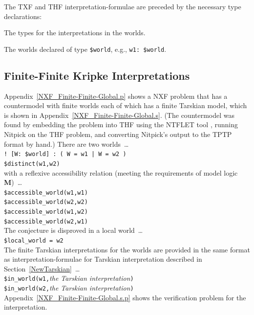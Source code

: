 \documentclass{easychair}
\newcommand{\smalltt}[1]{\small \texttt{#1}}
\newenvironment{packed_itemize}{
\vspace*{-0.3em}
\begin{itemize}
\setlength{\partopsep}{0pt}
\setlength{\itemsep}{1pt}
\setlength{\parskip}{0pt}
\setlength{\parsep}{0pt}
}{\end{itemize}}
\begin{document}
\vspace*{0.5em}
The TXF and THF interpretation-formulae are preceded by the necessary type declarations:
\begin{packed_itemize}
\item The types for the interpretations in the worlds.
\item The worlds declared of type {\tt \$world}, e.g., {\tt w1: \$world}.
\end{packed_itemize}

\subsection{Finite-Finite Kripke Interpretations}
\label{NewKripkeFiniteFinite}

Appendix~\ref{NXF_Finite-Finite-Global.p} shows a NXF problem that has a countermodel with
finite worlds each of which has a finite Tarskian model, which is shown in
Appendix~\ref{NXF_Finite-Finite-Global.s}.
(The countermodel was found by embedding the problem into THF using the NTFLET tool 
\cite{Ste22,Ste22-LE}, running Nitpick on the THF problem, and converting Nitpick's output
to the TPTP format by hand.)
There are two worlds~\ldots \\
\hspace*{0.5cm}\smalltt{! [W: \$world] : ( W = w1 | W = w2 )} \\
\hspace*{0.5cm}\smalltt{\$distinct(w1,w2)} \\
with a reflexive accessibility relation (meeting the requirements of model logic {\bf M})~\ldots \\
\hspace*{0.5cm}\smalltt{\$accessible\_world(w1,w1)} \\
\hspace*{0.5cm}\smalltt{\$accessible\_world(w2,w2)} \\
\hspace*{0.5cm}\smalltt{\$accessible\_world(w1,w2)} \\
\hspace*{0.5cm}\smalltt{\$accessible\_world(w2,w1)} \\
The conjecture is disproved in a local world~\ldots \\
\hspace*{0.5cm}\smalltt{\$local\_world = w2} \\
The finite Tarskian interpretations for the worlds are provided in the same format as
interpretation-formulae for Tarskian interpretation described in Section~\ref{NewTarskian}~\ldots \\
\hspace*{0.5cm}\smalltt{\$in\_world(w1,}{\em the Tarskian interpretation}{\tt )} \\
\hspace*{0.5cm}\smalltt{\$in\_world(w2,}{\em the Tarskian interpretation}{\tt )} \\
Appendix~\ref{NXF_Finite-Finite-Global.s.p} shows the verification problem for the interpretation.
\end{document}
